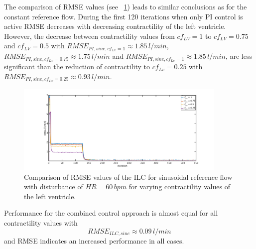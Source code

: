 The comparison of RMSE values (see \figurename~\ref{fig:RMSE_dist_sine_var_cf}) leads to similar conclusions as for the constant reference flow. During the first 120 iterations when only PI control is active RMSE decreases with decreasing contractility of the left ventricle. However, the decrease between contractility values from $cf_{LV}=1$ to $cf_{LV}=0.75$ and $cf_{LV}=0.5$ with $RMSE_{PI,sine,cf_{Lv}=1}\approx 1.85\, l/min$, $RMSE_{PI,sine,cf_{Lv}=0.75}\approx 1.75\, l/min$ and $RMSE_{PI,sine,cf_{Lv}=1}\approx 1.85\, l/min$, are less significant than the reduction of contractility to $cf_{Lv}=0.25$ with $RMSE_{PI,sine,cf_{Lv}=0.25}\approx 0.93\, l/min$.
\begin{figure}[ht!]
  \centering
  \includegraphics[width=0.9\textwidth]{images/chapt_5/ILC/RMSE_dist_sine_var_cf.pdf}
  \caption[RMSE Comparison of ILC at sinusoidal reference flow for varying left ventricular contractilities]{Comparison of RMSE values of the ILC for sinusoidal reference flow with disturbance of $HR=60\,bpm$ for varying contractility values of the left ventricle.}
  \label{fig:RMSE_dist_sine_var_cf}
\end{figure}
Performance for the combined control approach is almost equal for all contractility values with
\begin{equation}
  RMSE_{ILC,sine}\approx 0.09\, l/min
\end{equation}
and RMSE indicates an increased performance in all cases.

